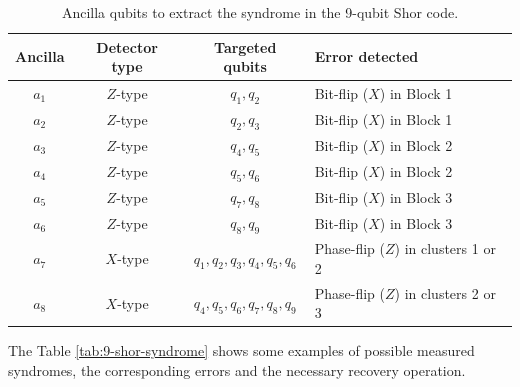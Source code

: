 \begin{table}[hbt!]
    \centering
    \renewcommand{\arraystretch}{1.2}
    \begin{tabularx}{\textwidth}{@{}cccX@{}}
    \toprule
    \textbf{Ancilla} & \textbf{Detector type} & \textbf{Targeted qubits} & \textbf{Error detected} \\ \midrule
    $a_1$ & $Z$-type & $q_1, q_2$ & Bit-flip ($X$) in Block 1 \\
    $a_2$ & $Z$-type & $q_2, q_3$ & Bit-flip ($X$) in Block 1 \\
    $a_3$ & $Z$-type & $q_4, q_5$ & Bit-flip ($X$) in Block 2 \\
    $a_4$ & $Z$-type & $q_5, q_6$ & Bit-flip ($X$) in Block 2 \\
    $a_5$ & $Z$-type & $q_7, q_8$ & Bit-flip ($X$) in Block 3 \\
    $a_6$ & $Z$-type & $q_8, q_9$ & Bit-flip ($X$) in Block 3 \\
    $a_7$ & $X$-type & $q_1, q_2, q_3, q_4, q_5, q_6$ & Phase-flip ($Z$) in clusters 1 or 2 \\
    $a_8$ & $X$-type & $q_4, q_5, q_6,  q_7, q_8, q_9$ & Phase-flip ($Z$) in clusters 2 or 3 \\ \bottomrule
    \end{tabularx}
    \caption[Ancilla qubits to extract the syndrome in the 9-qubit Shor code.]{Ancilla qubits to extract the syndrome in the 9-qubit Shor code.}
    \label{tab:9-shor-ancilla}
\end{table}

The Table \ref{tab:9-shor-syndrome} shows some examples of possible measured syndromes, the corresponding errors and the necessary recovery operation.

